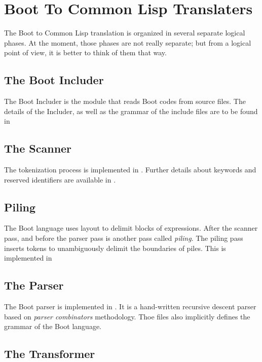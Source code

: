 \documentclass{article}
\begin{document}
\section{Boot To Common Lisp Translaters}
\label{sec:boot-to-cl}

The Boot to Common Lisp translation is organized in several
separate logical phases.  At the moment, those phases are not
really separate; but from a logical point of view, it is better
to think of them that way.


\subsection{The Boot Includer}
\label{sec:boot-to-cl:includer}

The Boot Includer is the module that reads Boot codes from source files.
The details of the Includer, as well as the grammar of the include
files are to be found in 


\subsection{The Scanner}
\label{sec:boot-to-cl:scanner}

The tokenization process is implemented in .  Further
details about keywords and reserved identifiers are available in
.


\subsection{Piling}
\label{sec:boot-to-cl:piling}

The Boot language uses layout to delimit blocks of expressions. After
the scanner pass, and before the parser pass is another pass called
\emph{piling}.  The piling pass inserts tokens to unambiguously delimit
the boundaries of piles.  This is implemented in


\subsection{The Parser}
\label{sec:boot-to-cl:piling}

The Boot parser is implemented in .  It is a hand-written
recursive descent parser
based on \emph{parser combinators} methodology.  Thoe files also
implicitly defines the grammar of the Boot language.


\subsection{The Transformer}
\label{sec:boot-to-cl:transfo}
\end{document}

